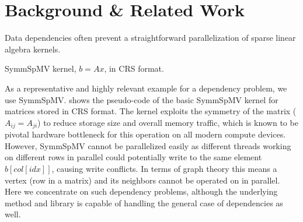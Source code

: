 \section{Background \& Related Work} \label{sec:background}
Data dependencies often prevent a straightforward parallelization of sparse linear algebra kernels.
\begin{algorithm}[b]
	\caption{\label{alg:symmSpMV} \acrshort{SymmSpMV} kernel,  $b=Ax$, in \acrshort{CRS} format.} %
	\begin{algorithmic}[1]
		\Statex{\textcolor{darkgray} {//Loop over all matrix rows}}
			\Statex{\hspace{1.5em} \textcolor{darkgray} {//Loop over all non-zero entries in a row}}
			\EndFor
		\EndFor
	\end{algorithmic}
\end{algorithm}
As a representative and highly relevant example for a \DTWO dependency problem, we use \acrfull{SymmSpMV}. 
 shows the pseudo-code of the basic \acrshort{SymmSpMV} kernel 
for matrices stored in \acrfull{CRS} \cite{CRS} format. The kernel exploits the symmetry
of the matrix ($A_{ij} = A_{ji}$) to reduce storage size and overall 
memory traffic, which is known to be pivotal hardware bottleneck for this operation on all modern compute devices.  
However, \acrshort{SymmSpMV} cannot be parallelized easily as 
different threads working on different rows in parallel could potentially 
write to the same element $b[col[idx]]$,
causing write conflicts.
In terms of graph theory this means a vertex (row in a matrix) and 
its \DTWO neighbors \cite{dist_k_def} cannot be operated on in parallel.
Here we concentrate on such \DTWO dependency problems, although 
the underlying method and library is capable of handling 
the general case of \DK dependencies as well.


